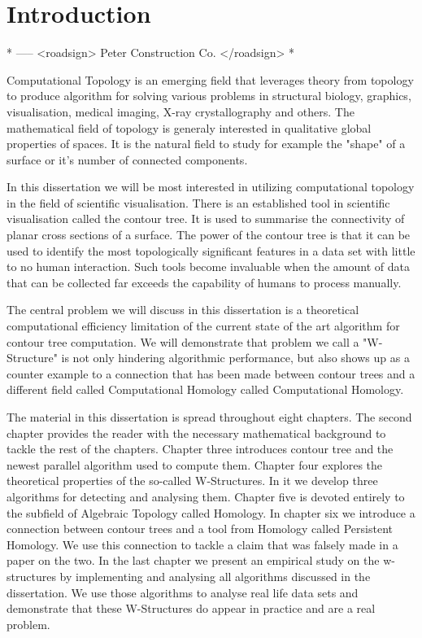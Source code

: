 \chapter{Introduction}
\label{chapter1}

* ----- <roadsign> Peter Construction Co. </roadsign> *


Computational Topology is an emerging field that leverages theory from topology to produce algorithm for solving various problems in structural biology, graphics, visualisation, medical imaging, X-ray crystallography and others. The mathematical field of topology is generaly interested in qualitative global properties of spaces. It is the natural field to study for example the "shape" of a surface or it's number of connected components. 

In this dissertation we will be most interested in utilizing computational topology in the field of scientific visualisation. There is an established tool in scientific visualisation called the contour tree. It is used to summarise the connectivity of planar cross sections of a surface. The power of the contour tree is that it can be used to identify the most topologically significant features in a data set with little to no human interaction. Such tools become invaluable when the amount of data that can be collected far exceeds the capability of humans to process manually. 

The central problem we will discuss in this dissertation is a theoretical computational efficiency limitation of the current state of the art algorithm for contour tree computation. We will demonstrate that problem we call a "W-Structure" is not only hindering algorithmic performance, but also shows up as a counter example to a connection that has been made between contour trees and a different field called Computational Homology called Computational Homology.

The material in this dissertation is spread throughout eight chapters. The second chapter provides the reader with the necessary mathematical background to tackle the rest of the chapters. Chapter three introduces contour tree and the newest parallel algorithm used to compute them. Chapter four explores the theoretical properties of the so-called W-Structures. In it we develop three algorithms for detecting and analysing them. Chapter five is devoted entirely to the subfield of Algebraic Topology called Homology. In chapter six we introduce a connection between contour trees and a tool from Homology called Persistent Homology. We use this connection to tackle a claim that was falsely made in a paper on the two. In the last chapter we present an empirical study on the w-structures by implementing and analysing all algorithms discussed in the dissertation. We use those algorithms to analyse real life data sets and demonstrate that these W-Structures do appear in practice and are a real problem.





